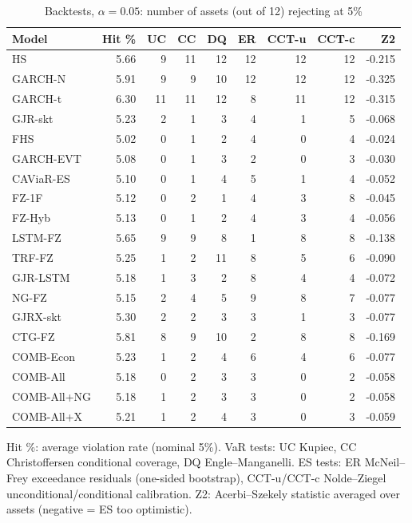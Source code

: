 \begin{table}[htbp]
\centering
\footnotesize
\caption{Backtests, $\alpha=0.05$: number of assets (out of 12) rejecting at 5\%}
\label{tab:bt_a050}
\begin{tabular}{lrrrrrrrr}
\toprule
Model & Hit \% & UC & CC & DQ & ER & CCT-u & CCT-c & Z2 \\
\midrule
HS & 5.66 & 9 & 11 & 12 & 12 & 12 & 12 & -0.215 \\
GARCH-N & 5.91 & 9 & 9 & 10 & 12 & 12 & 12 & -0.325 \\
GARCH-t & 6.30 & 11 & 11 & 12 & 8 & 11 & 12 & -0.315 \\
GJR-skt & 5.23 & 2 & 1 & 3 & 4 & 1 & 5 & -0.068 \\
FHS & 5.02 & 0 & 1 & 2 & 4 & 0 & 4 & -0.024 \\
GARCH-EVT & 5.08 & 0 & 1 & 3 & 2 & 0 & 3 & -0.030 \\
CAViaR-ES & 5.10 & 0 & 1 & 4 & 5 & 1 & 4 & -0.052 \\
FZ-1F & 5.12 & 0 & 2 & 1 & 4 & 3 & 8 & -0.045 \\
FZ-Hyb & 5.13 & 0 & 1 & 2 & 4 & 3 & 4 & -0.056 \\
LSTM-FZ & 5.65 & 9 & 9 & 8 & 1 & 8 & 8 & -0.138 \\
TRF-FZ & 5.25 & 1 & 2 & 11 & 8 & 5 & 6 & -0.090 \\
GJR-LSTM & 5.18 & 1 & 3 & 2 & 8 & 4 & 4 & -0.072 \\
NG-FZ & 5.15 & 2 & 4 & 5 & 9 & 8 & 7 & -0.077 \\
GJRX-skt & 5.30 & 2 & 2 & 3 & 3 & 1 & 3 & -0.077 \\
CTG-FZ & 5.81 & 8 & 9 & 10 & 2 & 8 & 8 & -0.169 \\
COMB-Econ & 5.23 & 1 & 2 & 4 & 6 & 4 & 6 & -0.077 \\
COMB-All & 5.18 & 0 & 2 & 3 & 3 & 0 & 2 & -0.058 \\
COMB-All+NG & 5.18 & 1 & 2 & 3 & 3 & 0 & 2 & -0.058 \\
COMB-All+X & 5.21 & 1 & 2 & 4 & 3 & 0 & 3 & -0.059 \\
\bottomrule
\end{tabular}
\par\smallskip\parbox{\linewidth}{\scriptsize Hit \%: average violation rate (nominal 5\%). VaR tests: UC Kupiec, CC Christoffersen conditional coverage, DQ Engle--Manganelli. ES tests: ER McNeil--Frey exceedance residuals (one-sided bootstrap), CCT-u/CCT-c Nolde--Ziegel unconditional/conditional calibration. Z2: Acerbi--Szekely statistic averaged over assets (negative = ES too optimistic).}
\end{table}